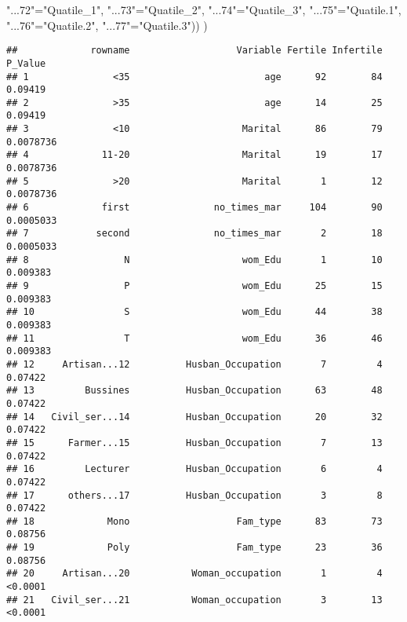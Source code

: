 \documentclass[
]{article}
\newenvironment{Shaded}{\begin{snugshade}}{\end{snugshade}}
\newcommand{\NormalTok}[1]{#1}
\newcommand{\OtherTok}[1]{\textcolor[rgb]{0.56,0.35,0.01}{#1}}
\newcommand{\StringTok}[1]{\textcolor[rgb]{0.31,0.60,0.02}{#1}}
\begin{document}
\begin{Shaded}
\begin{Highlighting}[]
                                          \StringTok{"...72"}\OtherTok{=}\StringTok{"Quatile\_1"}\NormalTok{,}
                                          \StringTok{"...73"}\OtherTok{=}\StringTok{"Quatile\_2"}\NormalTok{,}
                                          \StringTok{"...74"}\OtherTok{=}\StringTok{"Quatile\_3"}\NormalTok{,}
                                          \StringTok{"...75"}\OtherTok{=}\StringTok{"Quatile.1"}\NormalTok{,}
                                          \StringTok{"...76"}\OtherTok{=}\StringTok{"Quatile.2"}\NormalTok{,}
                                          \StringTok{"...77"}\OtherTok{=}\StringTok{"Quatile.3"}\NormalTok{))}
\NormalTok{)}
\end{Highlighting}
\end{Shaded}

\begin{verbatim}
##             rowname                   Variable Fertile Infertile   P_Value
## 1               <35                        age      92        84   0.09419
## 2               >35                        age      14        25   0.09419
## 3               <10                    Marital      86        79 0.0078736
## 4             11-20                    Marital      19        17 0.0078736
## 5               >20                    Marital       1        12 0.0078736
## 6             first               no_times_mar     104        90 0.0005033
## 7            second               no_times_mar       2        18 0.0005033
## 8                 N                    wom_Edu       1        10  0.009383
## 9                 P                    wom_Edu      25        15  0.009383
## 10                S                    wom_Edu      44        38  0.009383
## 11                T                    wom_Edu      36        46  0.009383
## 12     Artisan...12          Husban_Occupation       7         4   0.07422
## 13         Bussines          Husban_Occupation      63        48   0.07422
## 14   Civil_ser...14          Husban_Occupation      20        32   0.07422
## 15      Farmer...15          Husban_Occupation       7        13   0.07422
## 16         Lecturer          Husban_Occupation       6         4   0.07422
## 17      others...17          Husban_Occupation       3         8   0.07422
## 18             Mono                   Fam_type      83        73   0.08756
## 19             Poly                   Fam_type      23        36   0.08756
## 20     Artisan...20           Woman_occupation       1         4   <0.0001
## 21   Civil_ser...21           Woman_occupation       3        13   <0.0001

\end{verbatim}
\end{document}
